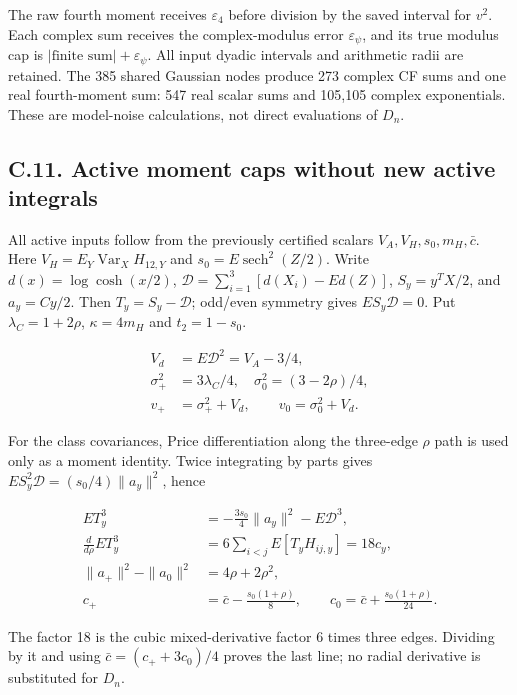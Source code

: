 \documentclass{article}
\begin{document}
The raw fourth moment receives \(\varepsilon_4\) before division by the
saved interval for \(v^2\). Each complex sum receives the
complex-modulus error \(\varepsilon_\psi\), and its true modulus cap is
\(|\text{finite sum}|+\varepsilon_\psi\). All input dyadic intervals and
arithmetic radii are retained. The 385 shared Gaussian nodes produce 273
complex CF sums and one real fourth-moment sum: 547 real scalar sums and
105,105 complex exponentials. These are model-noise calculations, not
direct evaluations of \(D_n\).

\subsection*{C.11. Active moment caps without new active
integrals}\label{c.11.-active-moment-caps-without-new-active-integrals}

All active inputs follow from the previously certified scalars
\(V_A,V_H,s_0,m_H,\bar c\). Here \(V_H=E_Y\operatorname{Var}_XH_{12,Y}\)
and \(s_0=E\operatorname{sech}^2(Z/2)\). Write \(d(x)=\log\cosh(x/2)\),
\(\mathcal D=\sum_{i=1}^3[d(X_i)-Ed(Z)]\), \(S_y=y^TX/2\), and
\(a_y=Cy/2\). Then \(T_y=S_y-\mathcal D\); odd/even symmetry gives
\(ES_y\mathcal D=0\). Put \(\lambda_C=1+2\rho\), \(\kappa=4m_H\) and
\(t_2=1-s_0\).

\[
\begin{aligned}
V_d&=E\mathcal D^2=V_A-3/4,\\
\sigma_+^2&=3\lambda_C/4,\quad \sigma_0^2=(3-2\rho)/4,\\
v_+&=\sigma_+^2+V_d,\qquad v_0=\sigma_0^2+V_d.
\end{aligned}
\tag{C.49}
\]

For the class covariances, Price differentiation along the three-edge
\(\rho\) path is used only as a moment identity. Twice integrating by
parts gives \(ES_y^2\mathcal D=(s_0/4)\|a_y\|^2\), hence

\[
\begin{aligned}
ET_y^3&=-\tfrac{3s_0}4\|a_y\|^2-E\mathcal D^3,\\
\frac d{d\rho}ET_y^3&=6\sum_{i<j}E[T_yH_{ij,y}]=18c_y,\\
\|a_+\|^2-\|a_0\|^2&=4\rho+2\rho^2,\\
c_+&=\bar c-\frac{s_0(1+\rho)}8,\qquad
c_0=\bar c+\frac{s_0(1+\rho)}{24}.
\end{aligned}
\tag{C.50}
\]

The factor 18 is the cubic mixed-derivative factor 6 times three edges.
Dividing by it and using \(\bar c=(c_++3c_0)/4\) proves the last line;
no radial derivative is substituted for \(D_n\).
\end{document}
